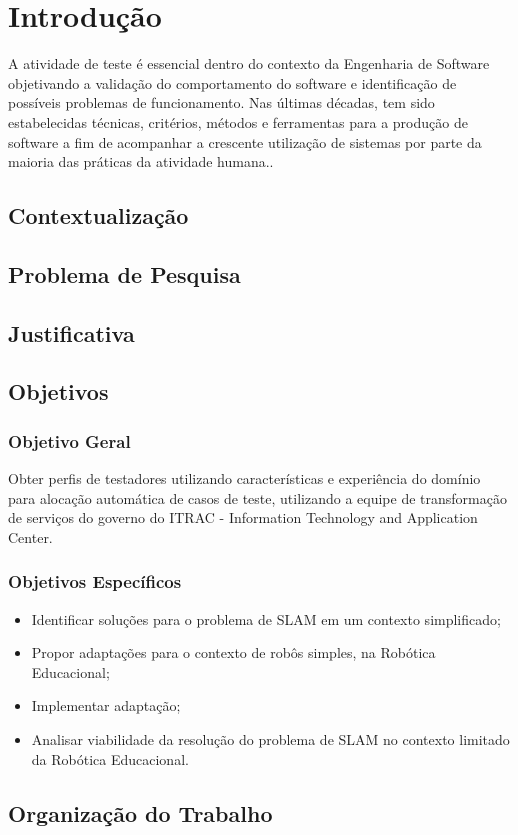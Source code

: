 \chapter[Introdução]{Introdução}

A atividade de teste é essencial dentro do contexto da Engenharia de Software objetivando a validação do comportamento
do software e identificação de possíveis problemas de funcionamento. Nas últimas décadas, tem sido estabelecidas
técnicas, critérios, métodos e ferramentas para a produção de software a fim de acompanhar a crescente utilização de
sistemas por parte da maioria das práticas da atividade humana.\cite{maldonado2004introduccao}.

	

\section{Contextualização}

\section{Problema de Pesquisa}

\section{Justificativa}

\section{Objetivos}
\subsection{Objetivo Geral}

Obter perfis de testadores utilizando características e experiência do domínio para alocação automática de casos de teste,
utilizando a equipe de transformação de serviços do governo do ITRAC - Information Technology and Application Center.

\subsection{Objetivos Específicos}

\begin{itemize}
		\item Identificar soluções para o problema de SLAM em um contexto simplificado;
		\item Propor adaptações para o contexto de robôs simples, na Robótica Educacional;
		\item Implementar adaptação;
		\item Analisar viabilidade da resolução do problema de SLAM no contexto limitado da Robótica Educacional.
	\end{itemize}

\section{Organização do Trabalho}
